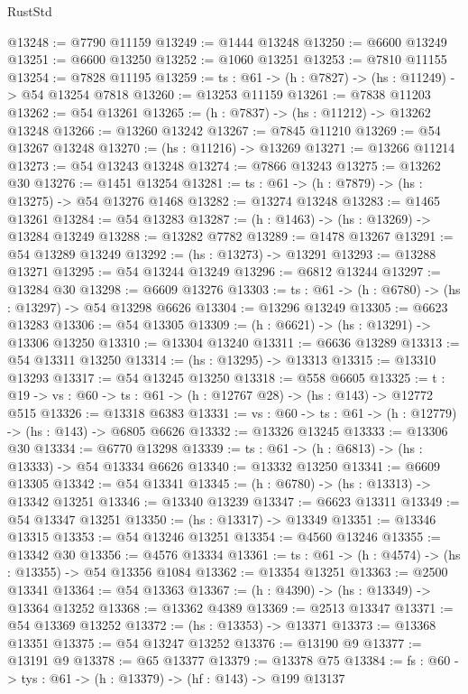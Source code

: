 \begin{lexlean}{RustStd}
\begin{coremodule}
@13248 := @7790 @11159
@13249 := @1444 @13248
@13250 := @6600 @13249
@13251 := @6600 @13250
@13252 := @1060 @13251
@13253 := @7810 @11155
@13254 := @7828 @11195
@13259 := {ts : @61} -> (h : @7827) -> (hs : @11249) -> @54 @13254 @7818
@13260 := @13253 @11159
@13261 := @7838 @11203
@13262 := @54 @13261
@13265 := (h : @7837) -> (hs : @11212) -> @13262 @13248
@13266 := @13260 @13242
@13267 := @7845 @11210
@13269 := @54 @13267 @13248
@13270 := (hs : @11216) -> @13269
@13271 := @13266 @11214
@13273 := @54 @13243 @13248
@13274 := @7866 @13243
@13275 := @13262 @30
@13276 := @1451 @13254
@13281 := {ts : @61} -> (h : @7879) -> (hs : @13275) -> @54 @13276 @1468
@13282 := @13274 @13248
@13283 := @1465 @13261
@13284 := @54 @13283
@13287 := (h : @1463) -> (hs : @13269) -> @13284 @13249
@13288 := @13282 @7782
@13289 := @1478 @13267
@13291 := @54 @13289 @13249
@13292 := (hs : @13273) -> @13291
@13293 := @13288 @13271
@13295 := @54 @13244 @13249
@13296 := @6812 @13244
@13297 := @13284 @30
@13298 := @6609 @13276
@13303 := {ts : @61} -> (h : @6780) -> (hs : @13297) -> @54 @13298 @6626
@13304 := @13296 @13249
@13305 := @6623 @13283
@13306 := @54 @13305
@13309 := (h : @6621) -> (hs : @13291) -> @13306 @13250
@13310 := @13304 @13240
@13311 := @6636 @13289
@13313 := @54 @13311 @13250
@13314 := (hs : @13295) -> @13313
@13315 := @13310 @13293
@13317 := @54 @13245 @13250
@13318 := @558 @6605
@13325 := {t : @19} -> {vs : @60} -> {ts : @61} -> (h : @12767 @28) -> (hs : @143) -> @12772 @515
@13326 := @13318 @6383
@13331 := {vs : @60} -> {ts : @61} -> (h : @12779) -> (hs : @143) -> @6805 @6626
@13332 := @13326 @13245
@13333 := @13306 @30
@13334 := @6770 @13298
@13339 := {ts : @61} -> (h : @6813) -> (hs : @13333) -> @54 @13334 @6626
@13340 := @13332 @13250
@13341 := @6609 @13305
@13342 := @54 @13341
@13345 := (h : @6780) -> (hs : @13313) -> @13342 @13251
@13346 := @13340 @13239
@13347 := @6623 @13311
@13349 := @54 @13347 @13251
@13350 := (hs : @13317) -> @13349
@13351 := @13346 @13315
@13353 := @54 @13246 @13251
@13354 := @4560 @13246
@13355 := @13342 @30
@13356 := @4576 @13334
@13361 := {ts : @61} -> (h : @4574) -> (hs : @13355) -> @54 @13356 @1084
@13362 := @13354 @13251
@13363 := @2500 @13341
@13364 := @54 @13363
@13367 := (h : @4390) -> (hs : @13349) -> @13364 @13252
@13368 := @13362 @4389
@13369 := @2513 @13347
@13371 := @54 @13369 @13252
@13372 := (hs : @13353) -> @13371
@13373 := @13368 @13351
@13375 := @54 @13247 @13252
@13376 := @13190 @9
@13377 := @13191 @9
@13378 := @65 @13377
@13379 := @13378 @75
@13384 := {fs : @60} -> {tys : @61} -> (h : @13379) -> (hf : @143) -> @199 @13137

\end{coremodule}
\end{lexlean}
